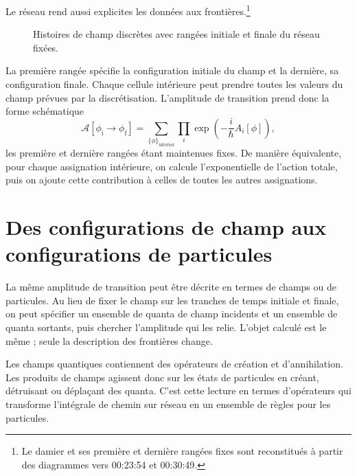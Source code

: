 Le réseau rend aussi explicites les données aux frontières.\footnote{Le damier et ses première et dernière rangées fixes sont reconstitués à partir des diagrammes vers 00:23:54 et 00:30:49.}
\begin{figure}[htbp]
\centering
{}
\caption{Histoires de champ discrètes avec rangées initiale et finale du réseau fixées.}
\end{figure}

La première rangée spécifie la configuration initiale du champ et la dernière, sa configuration finale. Chaque cellule intérieure peut prendre toutes les valeurs du champ prévues par la discrétisation. L’amplitude de transition prend donc la forme schématique
\begin{equation}
\mathcal{A}\!\left[\phi_{\mathrm{i}}\rightarrow\phi_{\mathrm{f}}\right]
=
\sum_{\{\phi\}_{\mathrm{interior}}}
\prod_i\exp\!\left(-\frac{i}{\hbar}A_i[\phi]\right),
\end{equation}
les première et dernière rangées étant maintenues fixes. De manière équivalente, pour chaque assignation intérieure, on calcule l’exponentielle de l’action totale, puis on ajoute cette contribution à celles de toutes les autres assignations.

\section{Des configurations de champ aux configurations de particules}

La même amplitude de transition peut être décrite en termes de champs ou de particules. Au lieu de fixer le champ sur les tranches de temps initiale et finale, on peut spécifier un ensemble de quanta de champ incidents et un ensemble de quanta sortants, puis chercher l’amplitude qui les relie. L’objet calculé est le même ; seule la description des frontières change.

Les champs quantiques contiennent des opérateurs de création et d’annihilation. Les produits de champs agissent donc sur les états de particules en créant, détruisant ou déplaçant des quanta. C’est cette lecture en termes d’opérateurs qui transforme l’intégrale de chemin sur réseau en un ensemble de règles pour les particules.

